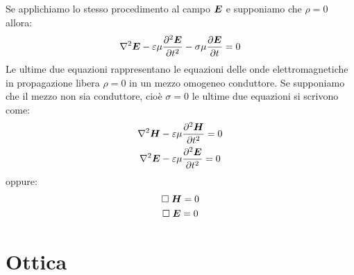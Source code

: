 Se applichiamo lo stesso procedimento al campo $\boldsymbol{E}$ e supponiamo che $\rho=0$ allora:
\begin{equation}
\nabla^2\boldsymbol{E}-\varepsilon\mu\frac{\partial^2\boldsymbol{E}}{\partial t^2}-\sigma\mu\frac{\partial\boldsymbol{E}}{\partial t}=0
\end{equation}
Le ultime due equazioni rappresentano le equazioni delle onde elettromagnetiche in propagazione libera $\rho=0$ in un mezzo omogeneo conduttore. Se supponiamo che il mezzo non sia conduttore, cioè $\sigma=0$ le ultime due equazioni si scrivono come:
\begin{gather}
\nabla^2\boldsymbol{H}-\varepsilon\mu\frac{\partial^2\boldsymbol{H}}{\partial t^2}=0\\
\nabla^2\boldsymbol{E}-\varepsilon\mu\frac{\partial^2\boldsymbol{E}}{\partial t^2}=0
\end{gather}
oppure:
\begin{gather}
\square\;\boldsymbol{H}=0\\
\square\;\boldsymbol{E}=0\\
\end{gather}


\chapter{Ottica}
\minitoc

